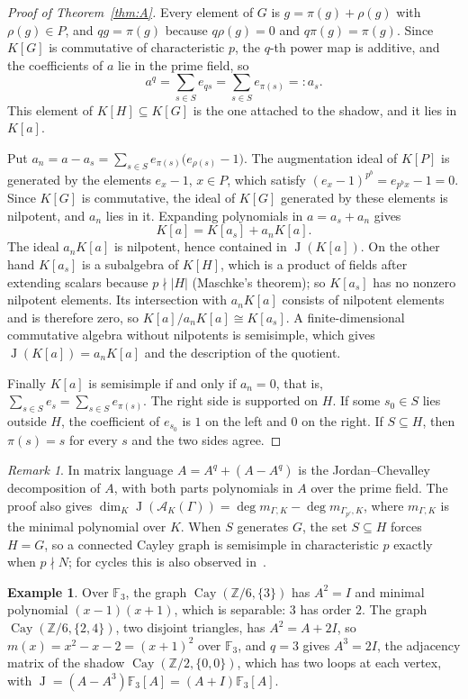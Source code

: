 \documentclass[11pt]{amsart}
\theoremstyle{definition}
\newtheorem{example}[theorem]{Example}
\theoremstyle{remark}
\newtheorem{remark}[theorem]{Remark}
\numberwithin{equation}{section}
\newcommand{\Z}{\mathbb{Z}}
\newcommand{\F}{\mathbb{F}}
\newcommand{\cA}{\mathcal{A}}
\newcommand{\Cay}{\operatorname{Cay}}
\newcommand{\rad}{\operatorname{J}}
\begin{document}
\begin{proof}[Proof of Theorem~\ref{thm:A}]
Every element of $G$ is $g=\pi(g)+\rho(g)$ with $\rho(g)\in P$, and $qg=\pi(g)$ because $q\rho(g)=0$ and $q\pi(g)=\pi(g)$. Since $K[G]$ is commutative of characteristic $p$, the $q$-th power map is additive, and the coefficients of $a$ lie in the prime field, so
\[
a^q=\sum_{s\in S}e_{qs}=\sum_{s\in S}e_{\pi(s)}=:a_s .
\]
This element of $K[H]\subseteq K[G]$ is the one attached to the shadow, and it lies in $K[a]$.

Put $a_n=a-a_s=\sum_{s\in S}e_{\pi(s)}\bigl(e_{\rho(s)}-1\bigr)$. The augmentation ideal of $K[P]$ is generated by the elements $e_x-1$, $x\in P$, which satisfy $(e_x-1)^{p^b}=e_{p^bx}-1=0$. Since $K[G]$ is commutative, the ideal of $K[G]$ generated by these elements is nilpotent, and $a_n$ lies in it. Expanding polynomials in $a=a_s+a_n$ gives
\[
K[a]=K[a_s]+a_n K[a].
\]
The ideal $a_nK[a]$ is nilpotent, hence contained in $\rad(K[a])$. On the other hand $K[a_s]$ is a subalgebra of $K[H]$, which is a product of fields after extending scalars because $p\nmid|H|$ (Maschke's theorem); so $K[a_s]$ has no nonzero nilpotent elements. Its intersection with $a_nK[a]$ consists of nilpotent elements and is therefore zero, so $K[a]/a_nK[a]\cong K[a_s]$. A finite-dimensional commutative algebra without nilpotents is semisimple, which gives $\rad(K[a])=a_nK[a]$ and the description of the quotient.

Finally $K[a]$ is semisimple if and only if $a_n=0$, that is, $\sum_{s\in S}e_s=\sum_{s\in S}e_{\pi(s)}$. The right side is supported on $H$. If some $s_0\in S$ lies outside $H$, the coefficient of $e_{s_0}$ is $1$ on the left and $0$ on the right. If $S\subseteq H$, then $\pi(s)=s$ for every $s$ and the two sides agree.
\end{proof}

\begin{remark}\label{rem:jordan}
In matrix language $A=A^q+(A-A^q)$ is the Jordan--Chevalley decomposition of $A$, with both parts polynomials in $A$ over the prime field. The proof also gives $\dim_K\rad(\cA_K(\Gamma))=\deg m_{\Gamma,K}-\deg m_{\Gamma_{p'},K}$, where $m_{\Gamma,K}$ is the minimal polynomial over $K$. When $S$ generates $G$, the set $S\subseteq H$ forces $H=G$, so a connected Cayley graph is semisimple in characteristic $p$ exactly when $p\nmid N$; for cycles this is also observed in~\cite{BMBc}.
\end{remark}

\begin{example}\label{ex:charp}
Over $\F_3$, the graph $\Cay(\Z/6,\{3\})$ has $A^2=I$ and minimal polynomial $(x-1)(x+1)$, which is separable: $3$ has order $2$. The graph $\Cay(\Z/6,\{2,4\})$, two disjoint triangles, has $A^2=A+2I$, so $m(x)=x^2-x-2=(x+1)^2$ over $\F_3$, and $q=3$ gives $A^3=2I$, the adjacency matrix of the shadow $\Cay(\Z/2,\{0,0\})$, which has two loops at each vertex, with $\rad=(A-A^3)\F_3[A]=(A+I)\F_3[A]$.
\end{example}
\end{document}
